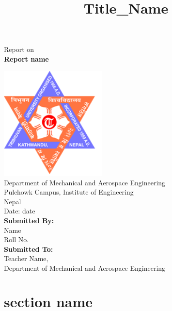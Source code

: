\documentclass[12pt,a4paper]{article}
\title{Title_Name}
\begin{document}
\begin{titlepage}
    \begin{center}
        \vspace{5cm}
        \Huge
        Report on \\
        \vspace{0.5cm}
        \LARGE
           \textbf{Report name} 
        \vspace{1.5cm}  
        
            
        \includegraphics[width=0.4\textwidth]{university.png}\\
         \vspace{1cm}    
        \large
        Department of Mechanical and Aerospace Engineering\\
        Pulchowk Campus, Institute of Engineering\\
        Nepal\\
        \vspace{1cm}
        Date: date\\
        \vspace{1cm}
    \textbf{Submitted By:} \\
    Name\\Roll No.\\
    \vspace{1cm}
    \textbf{Submitted To:} \\
    Teacher Name,\\
    Department of Mechanical and Aerospace Engineering\\
\end{center} 
\end{titlepage}
\tableofcontents
\listoffigures
\newpage
\section{section name}
\end{document}
